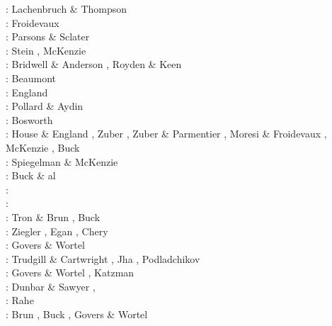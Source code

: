 \begin{scriptsize}
\nineteenseventytwo: Lachenbruch \& Thompson \cite{lath72}\\
\nineteenseventythree: Froidevaux \cite{froi73}\\
\nineteenseventyseven: Parsons \& Sclater \cite{pasc77}\\
\nineteenseventyeight: Stein \cite{stei78}, McKenzie \cite{mcke78}\\
\nineteeneighty: Bridwell \& Anderson \cite{bran80}, Royden \& Keen \cite{roke80}\\
\nineteeneightytwo: Beaumont \etal \cite{bekb82}\\
\nineteeneightythree: England \cite{engl83}\\
\nineteeneightyfour: Pollard \& Aydin \cite{poay84}\\
\nineteeneightyfive: Bosworth \cite{bosw85}\\
\nineteeneightysix: House \& England \cite{hoen86b}, Zuber \etal \cite{zupf86}, 
                    Zuber \& Parmentier \cite{zupa86}, Moresi \& Froidevaux \cite{mofr86},
                    McKenzie \cite{mcke86}, Buck \cite{buck86}\\
\nineteeneightyseven: Spiegelman \& McKenzie \cite{spmc87}\\
\nineteeneightyeight: Buck \& al \cite{bums88}\\
\nineteeneightynine: \cite{mewi89}\cite{brbe89}\cite{ismb89}\cite{soen89}\cite{brbe89b}\cite{brbe89c}\\
\nineteenninety: \cite{fara90}\cite{lipa90}\cite{mccl90}\cite{chmo90}\cite{chmo90b}\\
\nineteenninetyone: Tron \& Brun \cite{trbr91}, Buck \cite{buck91}\\
\nineteenninetytwo: Ziegler \cite{zieg92b}, Egan \cite{egan92}, Chery \etal \cite{chld92}\\
\nineteenninetythree: Govers \& Wortel \cite{gowo93}\\
\nineteenninetyfour: Trudgill \& Cartwright \cite{trca94}, Jha \etal \cite{jhpp94},
                     Podladchikov \etal \cite{popy94}\\
\nineteenninetyfive: Govers \& Wortel \cite{gowo95}, Katzman \etal \cite{katl95}\\
\nineteenninetysix: Dunbar \& Sawyer \cite{dusa96}, \cite{beda96}\cite{mada96}\\
\nineteenninetyeight: Rahe \etal \cite{rafm98}\\
\nineteenninetynine: Brun \cite{brun99}, Buck \etal \cite{bulp99}, 
                     Govers \& Wortel \cite{gowo99}\\

\end{scriptsize}
